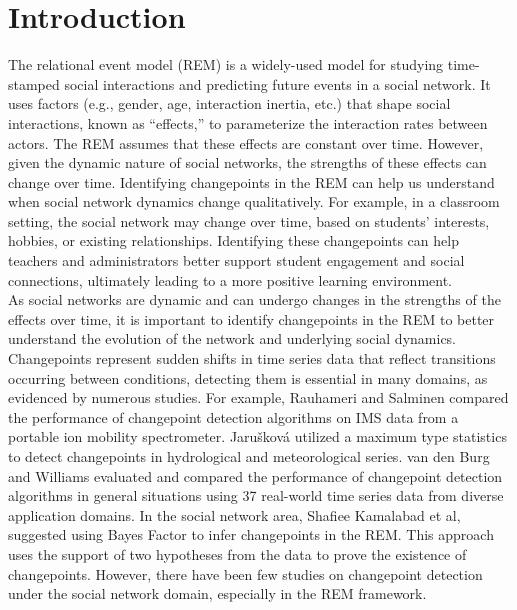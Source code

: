 \documentclass[]{interact}
\theoremstyle{plain}%
\theoremstyle{definition}
\theoremstyle{remark}
\begin{document}
	\newpage


	\section{\fontsize{14}{15}\selectfont Introduction} \label{sec:intro}
	
	\hspace{0.2cm} The relational event model (REM) is a widely-used model for studying time-stamped social interactions and predicting future events in a social network. It uses factors (e.g., gender, age, interaction inertia, etc.) that shape social interactions, known as ``effects,''\cite{buttsRelationalEventFramework2008} to parameterize the interaction rates between actors. The REM assumes that these effects are constant over time. However, given the dynamic nature of social networks, the strengths of these effects can change over time. Identifying changepoints in the REM can help us understand when social network dynamics change qualitatively. For example, in a classroom setting, the social network may change over time, based on students' interests, hobbies, or existing relationships. Identifying these changepoints can help teachers and administrators better support student engagement and social connections, ultimately leading to a more positive learning environment. \\
	
	As social networks are dynamic and can undergo changes in the strengths of the effects over time, it is important to identify changepoints in the REM to better understand the evolution of the network and underlying social dynamics. Changepoints represent sudden shifts in time series data that reflect transitions occurring between conditions\cite{sharmaTrendAnalysisChange2016}\cite{aminikhanghahiSurveyMethodsTime2017}, detecting them is essential in many domains, as evidenced by numerous studies. For example, Rauhameri and Salminen compared the performance of changepoint detection algorithms on IMS data from a portable ion mobility spectrometer\cite{rauhameriComparisonOnlineMethods2022}. Jarušková utilized a maximum type statistics to detect changepoints in hydrological and meteorological series\cite{jaruskovaProblemsApplicationChangePoint1997}. van den Burg and Williams evaluated and compared the performance of changepoint detection algorithms in general situations using 37 real-world time series data from diverse application domains\cite{burgEvaluationChangePoint2022}. In the social network area, Shafiee Kamalabad et al, suggested using Bayes Factor to infer changepoints in the REM\cite{shafieekamalabadWhatPointChange2023}. This approach uses the support of two hypotheses from the data to prove the existence of changepoints. However, there have been few studies on changepoint detection under the social network domain, especially in the REM framework. \\
	
\end{document}
